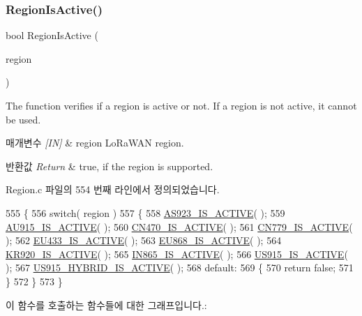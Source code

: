 \subsubsection{\texorpdfstring{Region\+Is\+Active()}{RegionIsActive()}}
{\footnotesize\ttfamily bool Region\+Is\+Active (\begin{DoxyParamCaption}\item[{\mbox{\hyperlink{group___l_o_r_a_m_a_c_ga80c48efda9ae02e14b58160d34a798dd}{Lo\+Ra\+Mac\+Region\+\_\+t}}}]{region }\end{DoxyParamCaption})}



The function verifies if a region is active or not. If a region is not active, it cannot be used. 


\begin{DoxyParams}{매개변수}
{\em \mbox{[}\+I\+N\mbox{]}} & region Lo\+Ra\+W\+AN region.\\
\hline
\end{DoxyParams}

\begin{DoxyRetVals}{반환값}
{\em Return} & true, if the region is supported. \\
\hline
\end{DoxyRetVals}


Region.\+c 파일의 554 번째 라인에서 정의되었습니다.


\begin{DoxyCode}
555 \{
556     \textcolor{keywordflow}{switch}( region )
557     \{
558         \mbox{\hyperlink{_region_8c_a85100d4eeeb40a55fe4c10aad2798ef6}{AS923\_IS\_ACTIVE}}( );
559         \mbox{\hyperlink{_region_8c_a71cbcfb529cc4fb2d4fdd29c9dde2ca0}{AU915\_IS\_ACTIVE}}( );
560         \mbox{\hyperlink{_region_8c_ad762ad3d2426790152b07114999ca3f7}{CN470\_IS\_ACTIVE}}( );
561         \mbox{\hyperlink{_region_8c_a0f35a620cfb65d6e2d9a7c1e308cd5d7}{CN779\_IS\_ACTIVE}}( );
562         \mbox{\hyperlink{_region_8c_a134d2c22f0d78f567707c5fae366a23e}{EU433\_IS\_ACTIVE}}( );
563         \mbox{\hyperlink{_region_8c_a4d7a2a53ddede644503b7b3a7bb7a487}{EU868\_IS\_ACTIVE}}( );
564         \mbox{\hyperlink{_region_8c_a20afbfd9d9cada0d5a0a0c61ba0ab3a4}{KR920\_IS\_ACTIVE}}( );
565         \mbox{\hyperlink{_region_8c_ac4c2eca1b07c045b3fb4fbd529bb5123}{IN865\_IS\_ACTIVE}}( );
566         \mbox{\hyperlink{_region_8c_ab6c912e257f33d3cef96a4170339ec35}{US915\_IS\_ACTIVE}}( );
567         \mbox{\hyperlink{_region_8c_aa78bb55003d581083319c0a0464c739f}{US915\_HYBRID\_IS\_ACTIVE}}( );
568         \textcolor{keywordflow}{default}:
569         \{
570             \textcolor{keywordflow}{return} \textcolor{keyword}{false};
571         \}
572     \}
573 \}
\end{DoxyCode}
이 함수를 호출하는 함수들에 대한 그래프입니다.\+:
\mbox{\label{group___r_e_g_i_o_n_gae82a94e6d4141122e1a20b5ba1936c8e}} 
